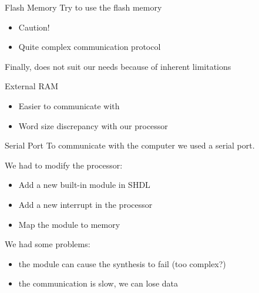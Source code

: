 \documentclass{beamer}
\begin{document}
      \begin{frame}{Flash Memory}
        Try to use the flash memory
        \begin{itemize}
          \item Caution!
          \item Quite complex communication protocol
        \end{itemize}
        \pause
        Finally, does not suit our needs because of inherent limitations
      \end{frame}

      \begin{frame}{External RAM}
        \begin{itemize}
          \item Easier to communicate with
          \item Word size discrepancy with our processor
        \end{itemize}
      \end{frame}

      \begin{frame}{Serial Port}
        To communicate with the computer we used a serial port.

        \pause
        We had to modify the processor:
        \begin{itemize}
          \item Add a new built-in module in SHDL
          \item Add a new interrupt in the processor
          \item Map the module to memory
        \end{itemize}

        \pause
        We had some problems:
        \begin{itemize}
          \item the module can cause the synthesis to fail (too complex?)
          \item the communication is slow, we can lose data
        \end{itemize}
      \end{frame}
\end{document}
